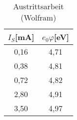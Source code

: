 \begin{table}[h]
	\begin{center}
		\begin{tabular}{cc}
			$I_S$[mA]& $e_0\varphi$[eV] \\ \hline
			0,16&4,71\\
			0,38&4,81\\
			0,72&4,82\\
			2,80&4,91\\
			3,50&4,97
		\end{tabular}
		\caption{Austrittsarbeit (Wolfram)}
		\label{tabe1}
	\end{center}
\end{table}